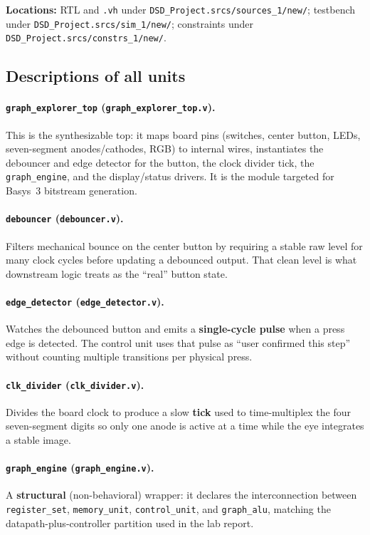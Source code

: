 \documentclass[11pt,a4paper]{article}
\newcommand{\srcpath}{\texttt{DSD\_Project.srcs/sources\_1/new/}}
\newcommand{\simpath}{\texttt{DSD\_Project.srcs/sim\_1/new/}}
\newcommand{\conpath}{\texttt{DSD\_Project.srcs/constrs\_1/new/}}
\begin{document}
\noindent\textbf{Locations:} RTL and \texttt{.vh} under \srcpath{}; testbench under \simpath{}; constraints under \conpath{}.

\subsection{Descriptions of all units}

\paragraph{\texttt{graph\_explorer\_top} (\texttt{graph\_explorer\_top.v}).}
This is the synthesizable top: it maps board pins (switches, center button, LEDs, seven-segment anodes/cathodes, RGB) to internal wires, instantiates the debouncer and edge detector for the button, the clock divider tick, the \texttt{graph\_engine}, and the display/status drivers. It is the module targeted for Basys~3 bitstream generation.

\paragraph{\texttt{debouncer} (\texttt{debouncer.v}).}
Filters mechanical bounce on the center button by requiring a stable raw level for many clock cycles before updating a debounced output. That clean level is what downstream logic treats as the ``real'' button state.

\paragraph{\texttt{edge\_detector} (\texttt{edge\_detector.v}).}
Watches the debounced button and emits a \textbf{single-cycle pulse} when a press edge is detected. The control unit uses that pulse as ``user confirmed this step'' without counting multiple transitions per physical press.

\paragraph{\texttt{clk\_divider} (\texttt{clk\_divider.v}).}
Divides the board clock to produce a slow \textbf{tick} used to time-multiplex the four seven-segment digits so only one anode is active at a time while the eye integrates a stable image.

\paragraph{\texttt{graph\_engine} (\texttt{graph\_engine.v}).}
A \textbf{structural} (non-behavioral) wrapper: it declares the interconnection between \texttt{register\_set}, \texttt{memory\_unit}, \texttt{control\_unit}, and \texttt{graph\_alu}, matching the datapath-plus-controller partition used in the lab report.
\end{document}

